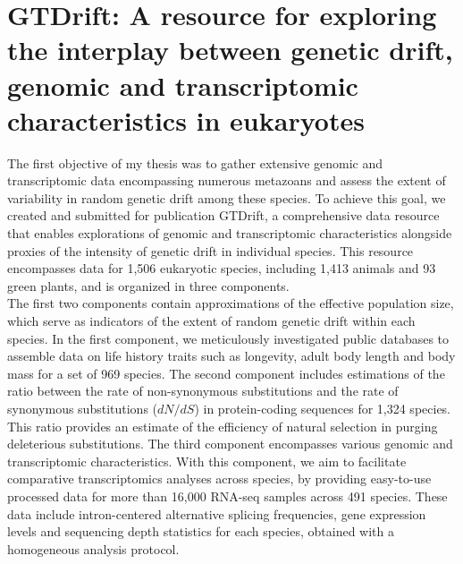 
    \thispagestyle{empty}
    \renewcommand{\chapterheadstartvskip}{
    	\thispagestyle{plain}
    	\vspace*{-70pt}
    }
    \chapter[GTDrift: A resource for exploring the interplay between genetic drift, genomic and transcriptomic characteristics in eukaryotes]{GTDrift: A resource for exploring the interplay between genetic drift, genomic and transcriptomic characteristics in eukaryotes}
    \label{chap:chap5-GTDrift}
    
    \vspace*{20pt}
    
    The first objective of my thesis was to gather extensive genomic and transcriptomic data encompassing numerous metazoans and assess the extent of variability in random genetic drift among these species. To achieve this goal, we created and submitted for publication GTDrift, a comprehensive data resource that enables explorations of genomic and transcriptomic characteristics alongside proxies of the intensity of genetic drift in individual species. This resource encompasses data for 1,506 eukaryotic species, including 1,413 animals and 93 green plants, and is organized in three components. \\
    
    The first two components contain approximations of the effective population size, which serve as indicators of the extent of random genetic drift within each species.
    In the first component, we meticulously investigated public databases to assemble data on life history traits such as longevity, adult body length and body mass for a set of 969 species. The second component includes estimations of the ratio between the rate of non-synonymous substitutions and the rate of synonymous substitutions (${dN}/{dS}$) in protein-coding sequences for 1,324 species. This ratio provides an estimate of the efficiency of natural selection in purging deleterious substitutions. 
    The third component encompasses various genomic and transcriptomic characteristics. With this component, we aim to facilitate comparative transcriptomics analyses across species, by providing easy-to-use processed data for more than 16,000 \acrshort{RNA}-seq samples across 491 species.
    These data include intron-centered alternative splicing frequencies, gene expression levels and sequencing depth statistics for each species, obtained with a homogeneous analysis protocol.  \\
    
